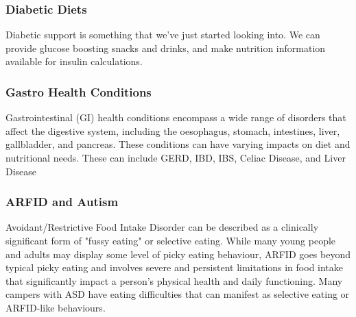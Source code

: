\subsubsection{Diabetic Diets}
Diabetic support is something that we've just started looking into. We can provide glucose boosting snacks and drinks, and make nutrition information available for insulin calculations.
\subsubsection{Gastro Health Conditions}
Gastrointestinal (GI) health conditions encompass a wide range of disorders that affect the digestive system, including the oesophagus, stomach, intestines, liver, gallbladder, and pancreas. These conditions can have varying impacts on diet and nutritional needs. These can include GERD, IBD, IBS, Celiac Disease, and Liver Disease 
\subsubsection{ARFID and Autism}
Avoidant/Restrictive Food Intake Disorder can be described as a clinically significant form of "fussy eating" or selective eating. While many young people and adults may display some level of picky eating behaviour, ARFID goes beyond typical picky eating and involves severe and persistent limitations in food intake that significantly impact a person's physical health and daily functioning. Many campers with ASD have eating difficulties that can manifest as selective eating or ARFID-like behaviours. 
